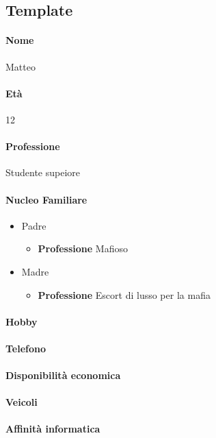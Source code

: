 \documentclass[../../UUX_Personas.tex]{subfiles}
\begin{document}
	\subsection{Template}
	\paragraph{Nome} Matteo
	\paragraph{Età} 12
	\paragraph{Professione} Studente supeiore
	\paragraph{Nucleo Familiare}
	\begin{itemize}
		\item Padre
		\begin{itemize}
			\item \textbf{Professione} Mafioso 
		\end{itemize}
		\item Madre
		\begin{itemize}
			\item \textbf{Professione} Escort di lusso per la mafia 
		\end{itemize}
	\end{itemize}
	\paragraph{Hobby}
	\paragraph{Telefono}
	\paragraph{Disponibilità economica}
	\paragraph{Veicoli}
	\paragraph{Affinità informatica}
\end{document}
